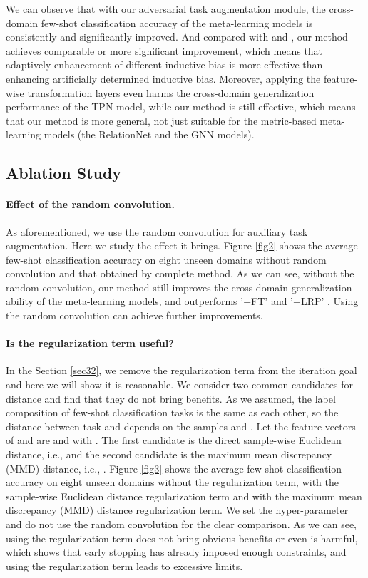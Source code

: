 \documentclass{article}
\begin{document}
We can observe that with our adversarial task augmentation module, the cross-domain few-shot classification accuracy of the meta-learning models is consistently and significantly improved. And compared with \cite{DBLP:conf/iclr/TsengLH020} and \cite{sun2020explanation}, our method achieves comparable or more significant improvement, which means that adaptively enhancement of different inductive bias is more effective than enhancing artificially determined inductive bias. Moreover, applying the feature-wise transformation layers even harms the cross-domain generalization performance of the TPN model, while our method is still effective, which means that our method is more general, not just suitable for the metric-based meta-learning models (the RelationNet and the GNN models).

\subsection{Ablation Study}\label{AS}
\paragraph{Effect of the random convolution.}As aforementioned, we use the random convolution for auxiliary task augmentation. Here we study the effect it brings. Figure \ref{fig2} shows the average few-shot classification accuracy on eight unseen domains without random convolution and that obtained by complete method. As we can see, without the random convolution, our method still improves the cross-domain generalization ability of the meta-learning models, and outperforms '+FT' \cite{DBLP:conf/iclr/TsengLH020} and '+LRP' \cite{sun2020explanation}. Using the random convolution can achieve further improvements.

\paragraph{Is the regularization term useful?}In the Section \ref{sec32}, we remove the regularization term  from the iteration goal and here we will show it is reasonable. We consider two common candidates for distance  and find that they do not bring benefits. As we assumed, the label composition of few-shot classification tasks is the same as each other, so the distance between task  and  depends on the samples  and . Let the feature vectors of  and  are  and  with . The first candidate is the direct sample-wise Euclidean distance, i.e.,  and the second candidate is the maximum mean discrepancy (MMD) distance, i.e., . Figure \ref{fig3} shows the average few-shot classification accuracy on eight unseen domains without the regularization term, with the sample-wise Euclidean distance regularization term and with the maximum mean discrepancy (MMD) distance regularization term. We set the hyper-parameter  and do not use the random convolution for the clear comparison. As we can see, using the regularization term does not bring obvious benefits or even is harmful, which shows that early stopping has already imposed enough constraints, and using the regularization term leads to excessive limits.
\end{document}
